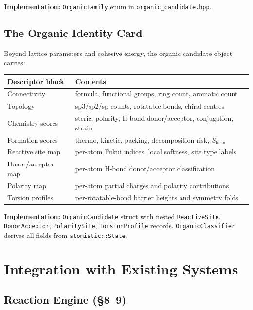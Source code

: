 \documentclass[11pt]{article}
\begin{document}
\textbf{Implementation:} \texttt{OrganicFamily} enum in
\texttt{organic\_candidate.hpp}.

\subsection{The Organic Identity Card}

Beyond lattice parameters and cohesive energy, the organic candidate object
carries:

\begin{center}
\begin{tabular}{lp{7cm}}
\toprule
Descriptor block & Contents \\
\midrule
Connectivity     & formula, functional groups, ring count, aromatic count \\
Topology         & sp3/sp2/sp counts, rotatable bonds, chiral centres \\
Chemistry scores & steric, polarity, H-bond donor/acceptor, conjugation, strain \\
Formation scores & thermo, kinetic, packing, decomposition risk, $S_\text{form}$ \\
Reactive site map & per-atom Fukui indices, local softness, site type labels \\
Donor/acceptor map & per-atom H-bond donor/acceptor classification \\
Polarity map     & per-atom partial charges and polarity contributions \\
Torsion profiles & per-rotatable-bond barrier heights and symmetry folds \\
\bottomrule
\end{tabular}
\end{center}

\textbf{Implementation:}
\texttt{OrganicCandidate} struct with nested \texttt{ReactiveSite},
\texttt{DonorAcceptor}, \texttt{PolaritySite}, \texttt{TorsionProfile}
records.  \texttt{OrganicClassifier} derives all fields from
\texttt{atomistic::State}.

\section{Integration with Existing Systems}
\label{sec:integration}

\subsection{Reaction Engine (\S8--9)}
\end{document}
